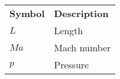 


% 
% 

\begin{longtable}[l]{p{75pt} p{200pt}} 
\textbf{Symbol}	&  \textbf{Description} \\ 
$L$	& Length\\ 
$Ma$	& Mach number\\
 $p$	& Pressure 
\end{longtable}



